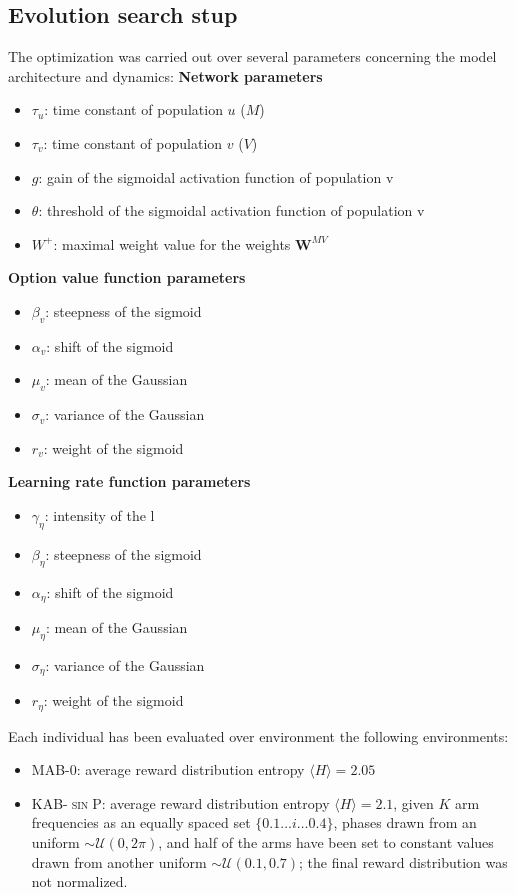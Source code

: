 \subsection{Evolution search stup}
The optimization was carried out over several parameters concerning the model architecture and dynamics:
\textbf{Network parameters}
\begin{itemize}
    \item $\tau_{u}$: time constant of population $u$ ($M$)
    \item $\tau_{v}$: time constant of population $v$ ($V$)
    \item $g$: gain of the sigmoidal activation function of population v
    \item $\theta$: threshold of the sigmoidal activation function of population v
    \item $W^{+}$: maximal weight value for the weights $\textbf{W}^{MV}$
\end{itemize}

\noindent \textbf{Option value function parameters}
\begin{itemize}
    \item $\beta_{v}$: steepness of the sigmoid
    \item $\alpha_{v}$: shift of the sigmoid
    \item $\mu_{v}$: mean of the Gaussian
    \item $\sigma_{v}$: variance of the Gaussian
    \item $r_{v}$: weight of the sigmoid
\end{itemize}

\noindent \textbf{Learning rate function parameters}
\begin{itemize}
    \item $\gamma_{\eta}$: intensity of the l
    \item $\beta_{\eta}$: steepness of the sigmoid
    \item $\alpha_{\eta}$: shift of the sigmoid
    \item $\mu_{\eta}$: mean of the Gaussian
    \item $\sigma_{\eta}$: variance of the Gaussian
    \item $r_{\eta}$: weight of the sigmoid
\end{itemize}

\noindent Each individual has been evaluated over environment the following environments:

\begin{itemize}
    \item \textsc{MAB-0}: average reward distribution entropy $\langle H\rangle=2.05$
    \item \textsc{KAB-$\sin$P}: average reward distribution entropy $\langle H\rangle=2.1$, given $K$ arm frequencies as an equally spaced set $\{0.1\ldots i\ldots 0.4\}$, phases drawn from an uniform $\sim \mathcal{U}(0, 2\pi)$, and half of the arms have been set to constant values drawn from
        another uniform $\sim \mathcal{U}(0.1, 0.7)$; the final reward distribution was not normalized.
\end{itemize}

